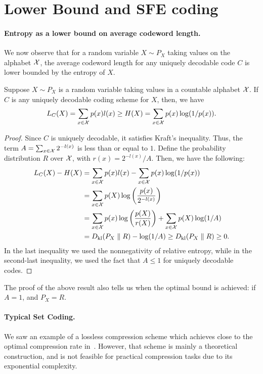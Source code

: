    
\section{Lower Bound and SFE coding}


    \paragraph{Entropy as a lower bound on average codeword length.}  We now observe that for a random variable $X \sim P_X$ taking  values on the alphabet $\mathcal{X}$,  the average codeword length for any uniquely decodable code $C$ is lower bounded by the entropy of $X$. 

    \begin{theorem}
        \label{thm:source-coding-theorem} Suppose $X \sim P_X$ is a random variable taking values in a countable alphabet $\mathcal{X}$. If $C$ is any uniquely decodable coding scheme for $X$, then, we have 
        \begin{align}
            L_C(X) = \sum_{x \in \mathcal{X}} p(x) l(x) \geq H(X) = \sum_{x \in \mathcal{X}} p(x) \log(1/p(x)). 
        \end{align}
    \end{theorem}   
    \begin{proof}
        Since $C$ is uniquely decodable, it satisfies Kraft's inequality. Thus, the term $A = \sum_{x \in \mathcal{X}} 2^{-l(x)}$ is less than or equal to $1$. Define the probability distribution $R$ over $\mathcal{X}$, with \pmf $r(x) = 2^{-l(x)}/A$. Then, we have the following: 
        \begin{align}
            L_C(X) - H(X) &= \sum_{x \in \mathcal{X}} p(x) l(x) - \sum_{x \in \mathcal{X}} p(x) \log(1/p(x))\\
            & = \sum_{x \in \mathcal{X}} p(X) \log \left( \frac{p(x)}{2^{-l(x)}} \right)  \\
            & = \sum_{x \in \mathcal{X}} p(x) \log \left( \frac{p(X)}{r(X)} \right) + \sum_{x \in \mathcal{X}} p(X) \log(1/A)  \\
            & = D_{\text{kl}}(P_X \parallel R) - \log(1/A) \geq D_{\text{kl}}(P_X \parallel R) \geq 0. 
        \end{align}
        In the last inequality we used the nonnegativity of relative entropy, while in the second-last inequality, we used the fact that $A \leq 1$ for uniquely decodable codes. 
    \end{proof}
    The proof of the above result also tells us when the optimal bound is achieved: if $A=1$, and $P_X = R$. 

    \paragraph{Typical Set Coding.} We saw an example of a lossless compression scheme which achieves close to the optimal compression rate in~. However, that scheme is mainly a theoretical construction, and is not feasible for practical compression tasks due to its exponential complexity. 


